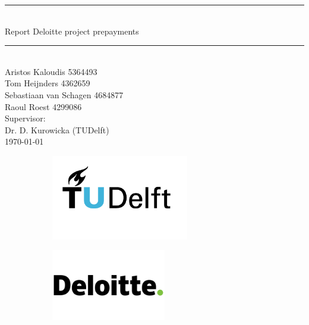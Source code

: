 \documentclass[11pt,titlepage,a4paper]{article}
\begin{document}
    \begin{titlepage}
        \vspace*{\fill}
        \centering
        \par\noindent\rule{\textwidth}{0.4pt} \\[0.7cm]
        {\Huge Report Deloitte project prepayments }\\[0.5cm]
        \par\noindent\rule{\textwidth}{0.4pt} \\[1cm]
        {\large 
        Aristos Kaloudis 5364493 \\
        Tom Heijnders 4362659 \\
        Sebastiaan van Schagen 4684877 \\
        Raoul Roest 4299086}\\[0.6cm]
        {\large Supervisor:\\ 
        Dr. D. Kurowicka (TUDelft)
        }\\[1cm]
        \today\\[5cm]
        \begin{figure}[h]
        \centering
        \begin{subfigure}{0.45\textwidth}
        \includegraphics[width=6cm]{Latex/Report/Figures/TU_Delft_logo_RGB.png}
        \end{subfigure}
        \begin{subfigure}{0.45\textwidth}
        \includegraphics[width=5cm]{Latex/Report/Figures/Logo_Deloitte.png}
        \end{subfigure}
        \end{figure}
        \vfill
    \end{titlepage}
\end{document}
